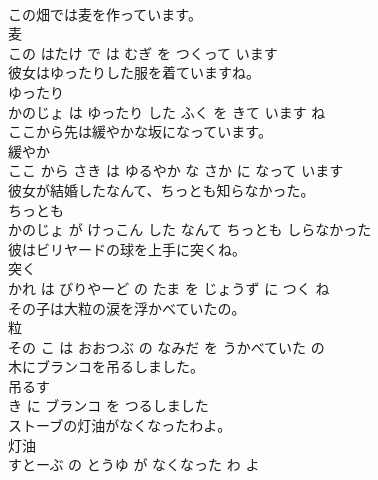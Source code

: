 \documentclass[8pt]{extreport}
\begin{document}
\begin{CJK}{UTF8}{min}
\\	この畑では麦を作っています。	
\\	麦 
\\	この はたけ で は むぎ を つくって います			
\\	彼女はゆったりした服を着ていますね。	
\\	ゆったり 
\\	かのじょ は ゆったり した ふく を きて います ね			
\\	ここから先は緩やかな坂になっています。	
\\	緩やか 
\\	ここ から さき は ゆるやか な さか に なって います			
\\	彼女が結婚したなんて、ちっとも知らなかった。	
\\	ちっとも 
\\	かのじょ が けっこん した なんて ちっとも しらなかった			
\\	彼はビリヤードの球を上手に突くね。	
\\	突く 
\\	かれ は びりやーど の たま を じょうず に つく ね			
\\	その子は大粒の涙を浮かべていたの。	
\\	粒 
\\	その こ は おおつぶ の なみだ を うかべていた の			
\\	木にブランコを吊るしました。	
\\	吊るす 
\\	き に ブランコ を つるしました			
\\	ストーブの灯油がなくなったわよ。	
\\	灯油 
\\	すとーぶ の とうゆ が なくなった わ よ			
\end{CJK}
\end{document}
